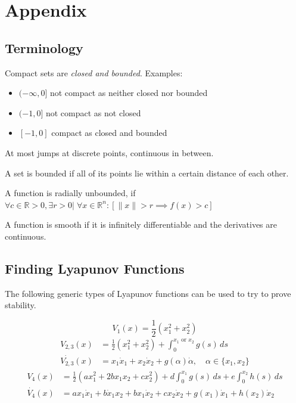 \section{Appendix}
\subsection{Terminology}

Compact sets are \textit{closed and bounded}. Examples:
\begin{itemize}
    \item $(-\infty, 0]$ not compact as neither closed nor bounded          %
    \item $(-1,0]$ not compact as not closed                                %
    \item $[-1,0]$ compact as closed and bounded
\end{itemize}

\newpar{}

At most jumps at discrete points, continuous in between.

\newpar{}

A set is bounded if all of its points lie within a certain distance of each other.

\newpar{}

A function is radially unbounded, if $\forall c\in \mathbb{R} > 0, \exists r>0 | \; \forall x\in \mathbb{R}^n :[\lVert x \rVert > r \implies f(x) > c ]$

\newpar{}

A function is smooth if it is infinitely differentiable and the derivatives are continuous.

\subsection{Finding Lyapunov Functions}\label{finding_lyapunov_functions}
The following generic types of Lyapunov functions can be used to try to prove stability.

\begin{equation*}
    V_1(x) = \frac{1}{2}(x_1^2 + x_2^2)
\end{equation*}
\begin{align*}
    V_{2,3}(x)       & = \frac{1}{2}(x_1^2 + x_2^2) + \int_0^{x_1 \text{ or }x_2} g(s) \, ds                 \\
    \dot{V_{2,3}}(x) & = x_1 \dot{x}_1 + x_2 \dot{x}_2 + g(\alpha)\dot{\alpha},\quad \alpha \in \{x_1, x_2\}
\end{align*}
{\small
\begin{align*}
    V_4(x)       & = \frac{1}{2}(a x_1^2 + 2b x_1 x_2 + c x_2^2) + d \int_0^{x_1} g(s) \, ds + e \int_0^{x_2} h(s) \, ds  \\
    \dot{V_4}(x) & = ax_1 \dot{x}_1 + b\dot{x}_1 x_2 + bx_1 \dot{x}_2 + cx_2 \dot{x}_2 + g(x_1)\dot{x}_1+ h(x_2)\dot{x}_2
\end{align*}
}

